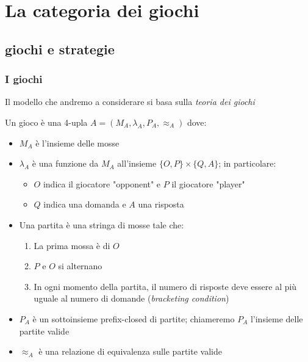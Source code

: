 \documentclass{beamer}
\begin{document}
\section{La categoria dei giochi}


\subsection{giochi e strategie}

\begin{frame}
	\frametitle{I giochi}
	
	Il modello che andremo a considerare si basa sulla \emph{teoria dei giochi}
	
	
	Un gioco è una 4-upla $A=( M_A , \lambda_A , P_A , \approx_A )$ dove:
	\begin{itemize}
	\item $M_A$ è l'insieme delle mosse
	\item $\lambda_A$ è una funzione da $M_A$ all'insieme $\{ O,P\} \times \{Q,A\}$; in particolare:
		\begin{itemize}
		\item $O$ indica il giocatore "opponent" e $P$ il giocatore "player"
		\item $Q$ indica una domanda e $A$ una risposta
		\end{itemize}
	\item Una partita è una stringa di mosse tale che:
		\begin{enumerate}
		\item La prima mossa è di $O$
		\item $P$ e $O$ si alternano
		\item In ogni momento della partita, il numero di risposte deve essere al più uguale al numero di domande (\emph{bracketing condition})
		\end{enumerate}
	\item $P_A$ è un sottoinsieme prefix-closed di partite; chiameremo $P_A$ l'insieme delle partite valide
	\item  $\approx_A$ è una relazione di equivalenza sulle partite valide
	\end{itemize}
	
	
\end{frame}
\end{document}
